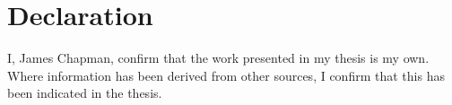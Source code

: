 \chapter*{Declaration}

I, James Chapman, confirm that the work presented in my thesis is my own.
Where information has been derived from other sources, I confirm that this has been indicated in the thesis.